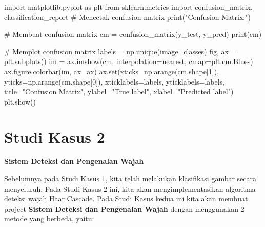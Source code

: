 \documentclass[
  letterpaper,
  DIV=11,
  numbers=noendperiod]{scrreprt}
\newenvironment{Shaded}{\begin{snugshade}}{\end{snugshade}}
\newcommand{\BuiltInTok}[1]{\textcolor[rgb]{0.00,0.23,0.31}{#1}}
\newcommand{\CommentTok}[1]{\textcolor[rgb]{0.37,0.37,0.37}{#1}}
\newcommand{\DecValTok}[1]{\textcolor[rgb]{0.68,0.00,0.00}{#1}}
\newcommand{\ImportTok}[1]{\textcolor[rgb]{0.00,0.46,0.62}{#1}}
\newcommand{\NormalTok}[1]{\textcolor[rgb]{0.00,0.23,0.31}{#1}}
\newcommand{\OperatorTok}[1]{\textcolor[rgb]{0.37,0.37,0.37}{#1}}
\newcommand{\StringTok}[1]{\textcolor[rgb]{0.13,0.47,0.30}{#1}}
\begin{document}
\begin{Shaded}
\begin{Highlighting}[]
\ImportTok{import}\NormalTok{ matplotlib.pyplot }\ImportTok{as}\NormalTok{ plt}
\ImportTok{from}\NormalTok{ sklearn.metrics }\ImportTok{import}\NormalTok{ confusion\_matrix, classification\_report}
\CommentTok{\# Mencetak confusion matrix}
\BuiltInTok{print}\NormalTok{(}\StringTok{"Confusion Matrix:"}\NormalTok{)}

\CommentTok{\# Membuat confusion matrix}
\NormalTok{cm }\OperatorTok{=}\NormalTok{ confusion\_matrix(y\_test, y\_pred)}
\BuiltInTok{print}\NormalTok{(cm)}

\CommentTok{\# Memplot confusion matrix}
\NormalTok{labels }\OperatorTok{=}\NormalTok{ np.unique(image\_classes)}
\NormalTok{fig, ax }\OperatorTok{=}\NormalTok{ plt.subplots()}
\NormalTok{im }\OperatorTok{=}\NormalTok{ ax.imshow(cm, interpolation}\OperatorTok{=}\StringTok{\textquotesingle{}nearest\textquotesingle{}}\NormalTok{, cmap}\OperatorTok{=}\NormalTok{plt.cm.Blues)}
\NormalTok{ax.figure.colorbar(im, ax}\OperatorTok{=}\NormalTok{ax)}
\NormalTok{ax.}\BuiltInTok{set}\NormalTok{(xticks}\OperatorTok{=}\NormalTok{np.arange(cm.shape[}\DecValTok{1}\NormalTok{]),}
\NormalTok{       yticks}\OperatorTok{=}\NormalTok{np.arange(cm.shape[}\DecValTok{0}\NormalTok{]),}
\NormalTok{       xticklabels}\OperatorTok{=}\NormalTok{labels, yticklabels}\OperatorTok{=}\NormalTok{labels,}
\NormalTok{       title}\OperatorTok{=}\StringTok{"Confusion Matrix"}\NormalTok{,}
\NormalTok{       ylabel}\OperatorTok{=}\StringTok{"True label"}\NormalTok{,}
\NormalTok{       xlabel}\OperatorTok{=}\StringTok{"Predicted label"}\NormalTok{)}
\NormalTok{plt.show()}
\end{Highlighting}
\end{Shaded}

\hypertarget{studi-kasus-2}{%
\chapter*{Studi Kasus 2}\label{studi-kasus-2}}


\textbf{Sistem Deteksi dan Pengenalan Wajah}

Sebelumnya pada Studi Kasus 1, kita telah melakukan klasifikasi gambar
secara menyeluruh. Pada Studi Kasus 2 ini, kita akan mengimplementasikan
algoritma deteksi wajah Haar Cascade. Pada Studi Kasus kedua ini kita
akan membuat project \textbf{Sistem Deteksi dan Pengenalan Wajah} dengan
menggunakan 2 metode yang berbeda, yaitu:
\end{document}
